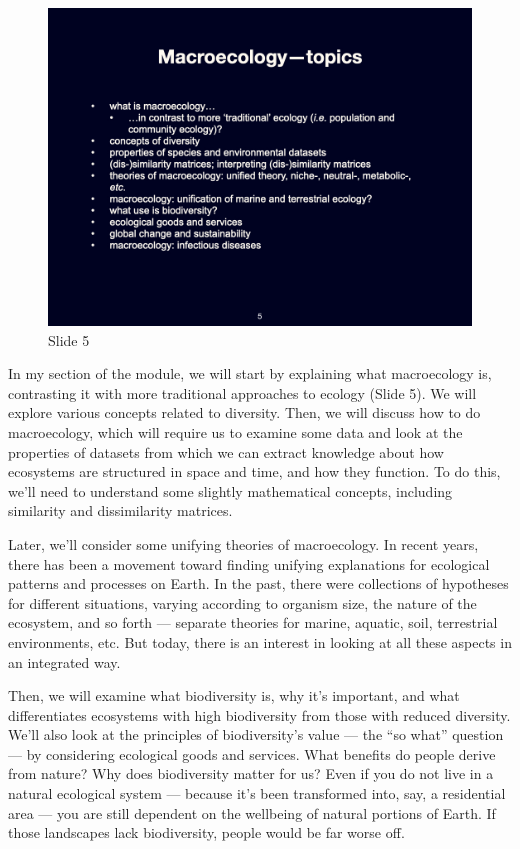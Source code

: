 \documentclass[
  10pt,
]{book}
\begin{document}
\begin{figure}[ht]
\centering
\includegraphics[width=0.8\linewidth]{../images/BDC334/BDC334-005.jpeg}
\caption*{Slide 5}
\end{figure}

In my section of the module, we will start by explaining what
macroecology is, contrasting it with more traditional approaches to
ecology (Slide 5). We will explore various concepts related to
diversity. Then, we will discuss how to do macroecology, which will
require us to examine some data and look at the properties of datasets
from which we can extract knowledge about how ecosystems are structured
in space and time, and how they function. To do this, we'll need to
understand some slightly mathematical concepts, including similarity and
dissimilarity matrices.

Later, we'll consider some unifying theories of macroecology. In recent
years, there has been a movement toward finding unifying explanations
for ecological patterns and processes on Earth. In the past, there were
collections of hypotheses for different situations, varying according to
organism size, the nature of the ecosystem, and so forth --- separate
theories for marine, aquatic, soil, terrestrial environments, etc. But
today, there is an interest in looking at all these aspects in an
integrated way.

Then, we will examine what biodiversity is, why it's important, and what
differentiates ecosystems with high biodiversity from those with reduced
diversity. We'll also look at the principles of biodiversity's value ---
the ``so what'' question --- by considering ecological goods and
services. What benefits do people derive from nature? Why does
biodiversity matter for us? Even if you do not live in a natural
ecological system --- because it's been transformed into, say, a
residential area --- you are still dependent on the wellbeing of natural
portions of Earth. If those landscapes lack biodiversity, people would
be far worse off.
\end{document}
